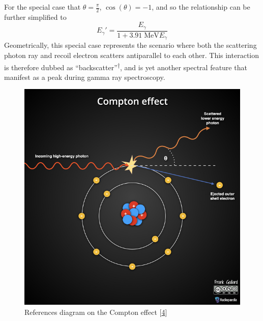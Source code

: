 \documentclass[12pt]{article}
\begin{document}
\begin{multicols}{2}
For the special case that $\theta=\frac{\pi}{2}$, $\cos(\theta)=-1$, and so the
relationship can be further simplified to
$$E_\gamma'=\frac{E_\gamma}{1+3.91\;\mathrm{MeV}E_\gamma}$$
Geometrically, this special case represents the scenario where both the scattering
photon ray and recoil electron scatters antiparallel to each other. This interaction
is therefore dubbed as ``backscatter''\textsuperscript{$\dagger$},
and is yet another spectral feature that manifest as a peak during gamma ray spectroscopy.
\renewcommand{\thefootnote}{$\dagger$}
\begin{figure}[H]
    \centering
    \includegraphics[width=0.98\linewidth]{figs/fig2.jpeg}
    \caption{
        References diagram on the Compton effect [\hyperref[sec:4]{4}]
    }
\end{figure}
\begin{figure}[H]

\end{figure}
\end{multicols}
\end{document}
